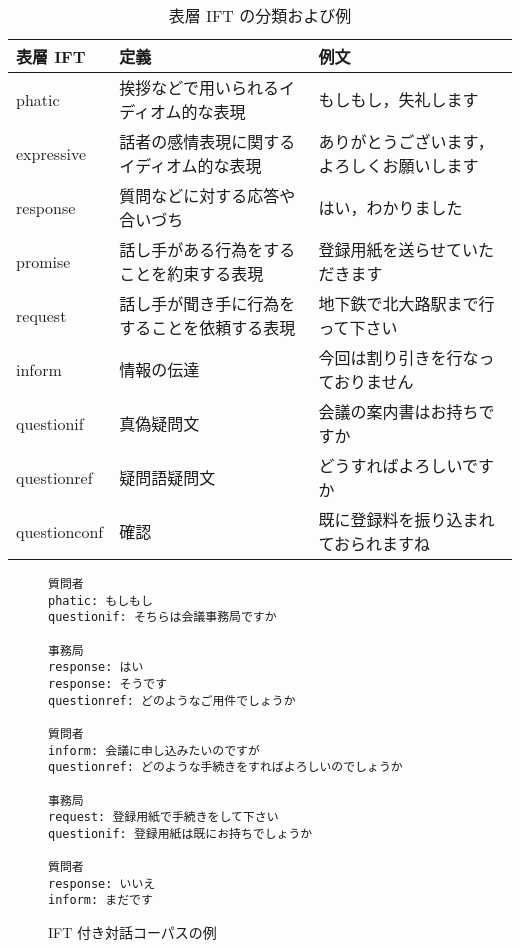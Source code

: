 \begin{table}[p]
\caption{表層 IFT の分類および例}
\label{Tab:IFTdef}
\begin{center}
\begin{tabular}{@{$\;$}l|p{6cm}|p{5.5cm}@{$\;$}}
\hline
表層 IFT        &  定義         &  例文         \\ \hline
\hline
phatic          & 挨拶などで用いられるイディオム的な表現
                & もしもし，\newline 失礼します \\ \hline
expressive      & 話者の感情表現に関するイディオム的な表現
                & ありがとうございます，\newline
                よろしくお願いします \\ \hline
response        & 質問などに対する応答や合いづち
                & はい，\newline わかりました \\ \hline
promise         & 話し手がある行為をすることを約束する表現
                & 登録用紙を送らせていただきます \\ \hline
request         & 話し手が聞き手に行為をすることを依頼する表現
                & 地下鉄で北大路駅まで行って下さい \\ \hline
inform          & 情報の伝達
                & 今回は割り引きを行なっておりません \\ \hline
questionif      & 真偽疑問文
                & 会議の案内書はお持ちですか \\ \hline
questionref     & 疑問語疑問文
                & どうすればよろしいですか \\ \hline
questionconf    & 確認
                & 既に登録料を振り込まれておられますね \\ \hline
\end{tabular}
\end{center}
\end{table}


\begin{figure}[p]
\begin{verbatim}
質問者
phatic: もしもし
questionif: そちらは会議事務局ですか

事務局
response: はい
response: そうです
questionref: どのようなご用件でしょうか

質問者
inform: 会議に申し込みたいのですが
questionref: どのような手続きをすればよろしいのでしょうか

事務局
request: 登録用紙で手続きをして下さい
questionif: 登録用紙は既にお持ちでしょうか

質問者
response: いいえ
inform: まだです
\end{verbatim}
\caption{IFT 付き対話コーパスの例}
\label{Fig:IFT-Corpus}
\end{figure}


